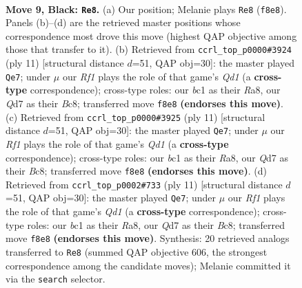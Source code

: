 \documentclass[11pt]{article}
\begin{document}
\clearpage

\begin{figure}[p]\centering
\begin{subfigure}{0.46\textwidth}\centering
\resizebox{\linewidth}{!}{%
\newchessgame
\chessboard[
  setfen={rnb2rk1/pp1qnppp/4p3/2PpP3/6PP/P1P5/2P2P2/R1BQKBNR b KQ - 0 9},
  showmover=false,
  pgfstyle=straightmove, color=movearrow, markmove={f8-e8}
]}
\caption{}
\end{subfigure}\hfill
\begin{subfigure}{0.46\textwidth}\centering
\resizebox{\linewidth}{!}{%
\newchessgame
\chessboard[
  setfen={r1bqkb1r/p1pp1ppp/2p2n2/4P3/8/8/PPP2PPP/RNBQKB1R b KQkq - 0 6},
  showmover=false,
  pgfstyle=straightmove, color=movearrow, markmove={d8-e7}
]}
\caption{}
\end{subfigure}
\\[4pt]
\begin{subfigure}{0.46\textwidth}\centering
\resizebox{\linewidth}{!}{%
\newchessgame
\chessboard[
  setfen={r1bqkb1r/p1pp1ppp/2p2n2/4P3/8/8/PPP2PPP/RNBQKB1R b KQkq - 0 6},
  showmover=false,
  pgfstyle=straightmove, color=movearrow, markmove={d8-e7}
]}
\caption{}
\end{subfigure}\hfill
\begin{subfigure}{0.46\textwidth}\centering
\resizebox{\linewidth}{!}{%
\newchessgame
\chessboard[
  setfen={r1bqkb1r/p1pp1ppp/2p2n2/4P3/8/8/PPP2PPP/RNBQKB1R b KQkq - 0 6},
  showmover=false,
  pgfstyle=straightmove, color=movearrow, markmove={d8-e7}
]}
\caption{}
\end{subfigure}
\caption{\textbf{Move 9, Black: \texttt{Re8}.} (a) Our position; Melanie plays \texttt{Re8} (\texttt{f8e8}). Panels (b)--(d) are the retrieved master positions whose correspondence most drove this move (highest QAP objective among those that transfer to it). (b) Retrieved from \texttt{ccrl\_top\_p0000\#3924} (ply 11) [structural distance $d$=51, QAP obj=30]: the master played \texttt{Qe7}; under $\mu$ our \emph{Rf1} plays the role of that game's \emph{Qd1} (a \textbf{cross-type} correspondence); cross-type roles: our \emph{b}c1 as their \emph{R}a8, our \emph{Q}d7 as their \emph{B}c8; transferred move \texttt{f8e8} \textbf{(endorses this move)}. (c) Retrieved from \texttt{ccrl\_top\_p0000\#3925} (ply 11) [structural distance $d$=51, QAP obj=30]: the master played \texttt{Qe7}; under $\mu$ our \emph{Rf1} plays the role of that game's \emph{Qd1} (a \textbf{cross-type} correspondence); cross-type roles: our \emph{b}c1 as their \emph{R}a8, our \emph{Q}d7 as their \emph{B}c8; transferred move \texttt{f8e8} \textbf{(endorses this move)}. (d) Retrieved from \texttt{ccrl\_top\_p0002\#733} (ply 11) [structural distance $d$=51, QAP obj=30]: the master played \texttt{Qe7}; under $\mu$ our \emph{Rf1} plays the role of that game's \emph{Qd1} (a \textbf{cross-type} correspondence); cross-type roles: our \emph{b}c1 as their \emph{R}a8, our \emph{Q}d7 as their \emph{B}c8; transferred move \texttt{f8e8} \textbf{(endorses this move)}. Synthesis: 20 retrieved analogs transferred to \texttt{Re8} (summed QAP objective 606, the strongest correspondence among the candidate moves); Melanie committed it via the \texttt{search} selector.}
\label{fig:thought-m17}
\end{figure}
\end{document}
